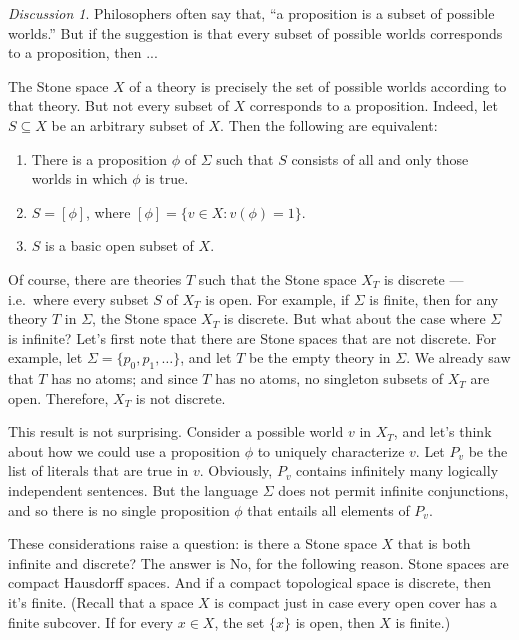 \documentclass[11pt]{article}
\theoremstyle{definition}
\theoremstyle{remark}
\newtheorem*{disc}{Discussion}
\begin{document}
\begin{disc} Philosophers often say that, ``a proposition is a subset
  of possible worlds.''  But if the suggestion is that every subset of
  possible worlds corresponds to a proposition, then ... 

  The Stone space $X$ of a theory is precisely the set of possible
  worlds according to that theory.  But not every subset of $X$
  corresponds to a proposition.  Indeed, let $S\subseteq X$ be an
  arbitrary subset of $X$.  Then the following are equivalent:
\begin{enumerate}
\item There is a proposition $\phi$ of $\Sigma$ such that $S$ consists
  of all and only those worlds in which $\phi$ is true.
\item $S=[\phi ]$, where $[\phi ]=\{ v\in X:v(\phi )=1 \}$.
\item $S$ is a basic open subset of $X$. 
\end{enumerate}

Of course, there are theories $T$ such that the Stone space $X_T$ is
discrete --- i.e.\ where every subset $S$ of $X_T$ is open.  For
example, if $\Sigma$ is finite, then for any theory $T$ in $\Sigma$,
the Stone space $X_T$ is discrete.  But what about the case where
$\Sigma$ is infinite?  Let's first note that there are Stone spaces
that are not discrete.  For example, let $\Sigma = \{ p_0,p_1,\dots
\}$, and let $T$ be the empty theory in $\Sigma$.  We already saw that
$T$ has no atoms; and since $T$ has no atoms, no singleton subsets of
$X_T$ are open.  Therefore, $X_T$ is not discrete.  

This result is not surprising.  Consider a possible world $v$ in
$X_T$, and let's think about how we could use a proposition $\phi$ to
uniquely characterize $v$.  Let $P_v$ be the list of literals that are
true in $v$.  Obviously, $P_v$ contains infinitely many logically
independent sentences.  But the language $\Sigma$ does not permit
infinite conjunctions, and so there is no single proposition $\phi$
that entails all elements of $P_v$. 

These considerations raise a question: is there a Stone space $X$ that
is both infinite and discrete?  The answer is No, for the following
reason.  Stone spaces are compact Hausdorff spaces.  And if a compact
topological space is discrete, then it's finite.  (Recall that a space
$X$ is compact just in case every open cover has a finite subcover.
If for every $x\in X$, the set $\{ x\}$ is open, then $X$ is finite.)


\end{disc}
\end{document}

